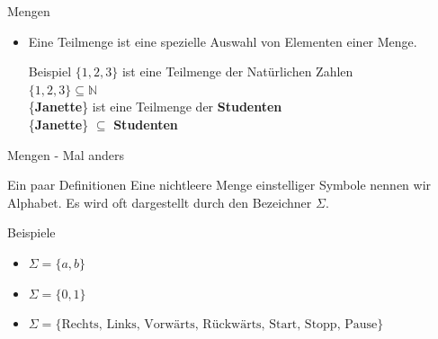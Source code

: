 \begin{frame}[fragile]{Mengen}
\begin{itemize}
{            \begin{exampleblock}{Beispiel}
                $\mathbf{1}$ ist ein Element der \textbf{Natürlichen Zahlen}\\
                $\mathbf{1} \in \mathbb{N}$\\
                \vspace*{0.5cm}
                \textbf{Janette} ist ein Element aus der Menge der \textbf{Studenten}\\
                \textbf{Janette} $\in$ \textbf{Studenten}\\
                \vspace*{0.5cm}
                $\mathbf{a}$ ist in der Menge $\mathbf{\{u, v, w\}}$ nicht enthalten\\
                $\mathbf{a} \notin \mathbf{\{u, v, w\}}$
            \end{exampleblock}
        }
        \item<6>
            \vspace*{0.5cm}
            Eine Teilmenge ist eine \alert{spezielle Auswahl} von Elementen einer Menge.\\
            
            
            \begin{exampleblock}{Beispiel}
                $\{1, 2, 3\}$ ist eine Teilmenge der Natürlichen Zahlen\\
                $\{1,2,3\} \subseteq \mathbb{N}$\\
                \vspace*{0.5cm}
                \{\textbf{Janette}\} ist eine Teilmenge der \textbf{Studenten}\\
                \{\textbf{Janette}\} $\subseteq$ \textbf{Studenten}
            \end{exampleblock}
            
    \end{itemize}
\end{frame}

\begin{frame}{Mengen - Mal anders}
    \begin{alertblock}{Ein paar Definitionen}
    Eine nichtleere Menge einstelliger Symbole nennen wir \alert{Alphabet}.
    Es wird oft dargestellt durch den Bezeichner $\Sigma$.\\
    \end{alertblock}
    \begin{exampleblock}{Beispiele}
    \begin{itemize}
        \item $\Sigma = \{a,b\}$
        \item $\Sigma = \{0,1\}$
        \item $\Sigma = \{\text{Rechts, Links, Vorwärts, Rückwärts, Start, Stopp, Pause}\}$
    \end{itemize}
    \end{exampleblock}
\end{frame}

